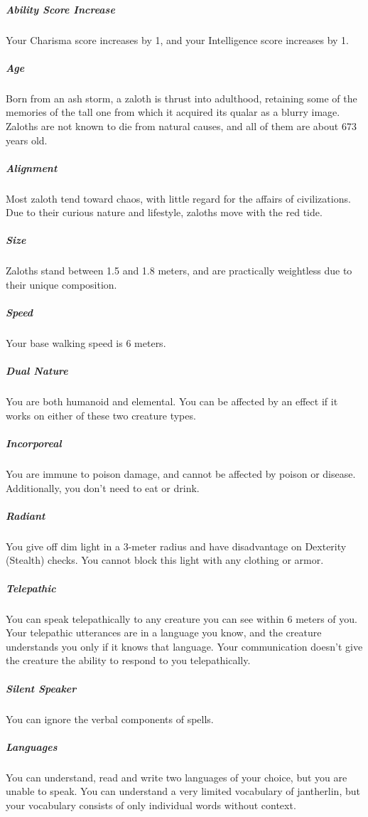     \subparagraph{Ability Score Increase} Your Charisma score increases by 1, and your Intelligence score increases by 1.

    \subparagraph{Age} Born from an ash storm, a zaloth is thrust into adulthood, retaining some of the memories of the tall one from which it acquired its qualar as a blurry image.
    Zaloths are not known to die from natural causes, and all of them are about 673 years old.

    \subparagraph{Alignment} Most zaloth tend toward chaos, with little regard for the affairs of civilizations.
    Due to their curious nature and lifestyle, zaloths move with the red tide.

    \subparagraph{Size} Zaloths stand between 1.5 and 1.8 meters, and are practically weightless due to their unique composition.

    \subparagraph{Speed} Your base walking speed is 6 meters.

    \subparagraph{Dual Nature} You are both humanoid and elemental.
    You can be affected by an effect if it works on either of these two creature types.

    \subparagraph{Incorporeal} You are immune to poison damage, and cannot be affected by poison or disease.
    Additionally, you don't need to eat or drink.


    \subparagraph{Radiant} You give off dim light in a 3-meter radius and have disadvantage on Dexterity (Stealth) checks.
    You cannot block this light with any clothing or armor.

    \subparagraph{Telepathic} You can speak telepathically to any creature you can see within 6 meters of you.
    Your telepathic utterances are in a language you know, and the creature understands you only if it knows that language.
    Your communication doesn't give the creature the ability to respond to you telepathically.

    \subparagraph{Silent Speaker} You can ignore the verbal components of spells.

    \subparagraph{Languages} You can understand, read and write two languages of your choice, but you are unable to speak.
    You can understand a very limited vocabulary of jantherlin, but your vocabulary consists of only individual words without context.

